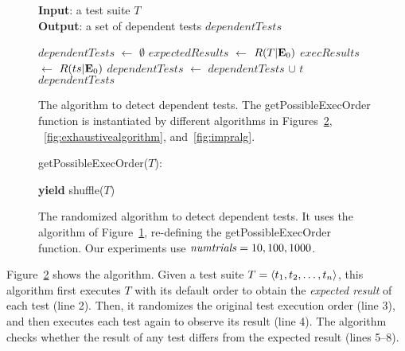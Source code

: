 \begin{figure}[t]
\textbf{Input}: a test suite $\mathit{T}$\\
\textbf{Output}: a set of dependent tests $\mathit{dependentTests}$\\
\vspace{-5mm}
\begin{algorithmic}[1]
\STATE $\mathit{dependentTests}$ $\leftarrow$ $\emptyset$
\STATE $\mathit{expectedResults}$ $\leftarrow$ $R(T|\mathbf{E}_0)$
\STATE $\mathit{execResults}$ $\leftarrow$ $R(ts|\mathbf{E}_0)$
\STATE $\mathit{dependentTests}$ $\leftarrow$ $\mathit{dependentTests}$ $\cup$ $\mathit{t}$
\ENDIF
\ENDFOR
\ENDFOR
\RETURN $\mathit{dependentTests}$
\end{algorithmic}


\vspace{-3mm}
\caption {The algorithm to detect dependent tests.
The getPossibleExecOrder function is instantiated
by different algorithms in Figures~\ref{fig:randalgorithm},
~\ref{fig:exhaustivealgorithm}, and~\ref{fig:impralg}.
}
\label{fig:basealgorithm}
\end{figure}


\begin{figure}[t]
getPossibleExecOrder($T$):\\
\vspace{-5mm}
\begin{algorithmic}[1]
\STATE \textbf{yield} shuffle($T$)
\ENDFOR
\end{algorithmic}

\vspace{-3mm}
\caption {The randomized algorithm to detect dependent tests.
It uses the algorithm of Figure~\ref{fig:basealgorithm}, re-defining
the getPossibleExecOrder function.
Our experiments use $\mathit{numtrials} = 10,
100, 1000$.}
\label{fig:randalgorithm}
\end{figure}


Figure~\ref{fig:randalgorithm} shows the algorithm.
Given a test suite $T =  \langle t_1, t_2, \ldots, t_n \rangle $, this algorithm
first executes $T$ with its default order
to obtain the \emph{expected result} of each test (line 2).
Then, it randomizes the original
test execution order (line 3), and then executes each test
again to observe its result (line 4). The algorithm checks
whether the result of any test differs from the
expected result (lines 5--8). 

